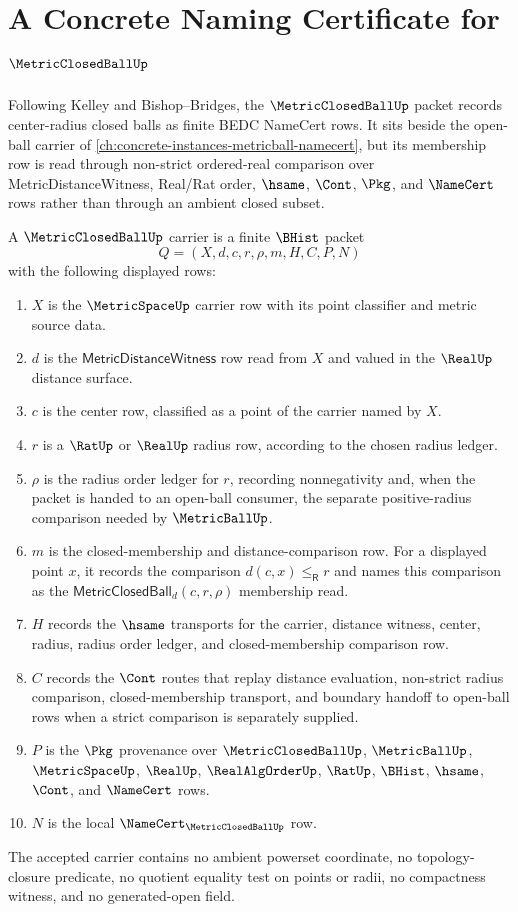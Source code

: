 \chapter{A Concrete Naming Certificate for $\MetricClosedBallUp$}
\label{ch:concrete-instances-metricclosedball-namecert}

Following Kelley and Bishop--Bridges, the $\MetricClosedBallUp$ packet records center-radius closed balls as finite BEDC NameCert rows. It sits beside the open-ball carrier of \autoref{ch:concrete-instances-metricball-namecert}, but its membership row is read through non-strict ordered-real comparison over MetricDistanceWitness, Real/Rat order, $\hsame$, $\Cont$, $\Pkg$, and $\NameCert$ rows rather than through an ambient closed subset.

\begin{definition}
\label{def:metric-closed-ball-carrier}
A $\MetricClosedBallUp$ carrier is a finite $\BHist$ packet
$$
Q=(X,d,c,r,\rho,m,H,C,P,N)
$$
with the following displayed rows:
\begin{enumerate}
\item $X$ is the $\MetricSpaceUp$ carrier row with its point classifier and metric source data.
\item $d$ is the $\mathsf{MetricDistanceWitness}$ row read from $X$ and valued in the $\RealUp$ distance surface.
\item $c$ is the center row, classified as a point of the carrier named by $X$.
\item $r$ is a $\RatUp$ or $\RealUp$ radius row, according to the chosen radius ledger.
\item $\rho$ is the radius order ledger for $r$, recording nonnegativity and, when the packet is handed to an open-ball consumer, the separate positive-radius comparison needed by $\MetricBallUp$.
\item $m$ is the closed-membership and distance-comparison row. For a displayed point $x$, it records the comparison $d(c,x)\leq_{\mathsf R}r$ and names this comparison as the $\mathsf{MetricClosedBall}_d(c,r,\rho)$ membership read.
\item $H$ records the $\hsame$ transports for the carrier, distance witness, center, radius, radius order ledger, and closed-membership comparison row.
\item $C$ records the $\Cont$ routes that replay distance evaluation, non-strict radius comparison, closed-membership transport, and boundary handoff to open-ball rows when a strict comparison is separately supplied.
\item $P$ is the $\Pkg$ provenance over $\MetricClosedBallUp$, $\MetricBallUp$, $\MetricSpaceUp$, $\RealUp$, $\RealAlgOrderUp$, $\RatUp$, $\BHist$, $\hsame$, $\Cont$, and $\NameCert$ rows.
\item $N$ is the local $\NameCert_{\MetricClosedBallUp}$ row.
\end{enumerate}
The accepted carrier contains no ambient powerset coordinate, no topology-closure predicate, no quotient equality test on points or radii, no compactness witness, and no generated-open field.
\end{definition}
